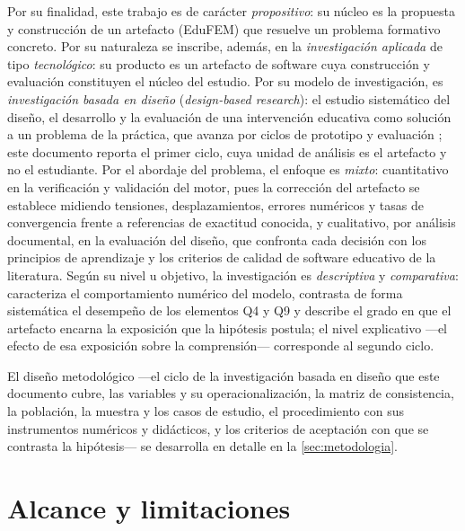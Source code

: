 Por su finalidad, este trabajo es de carácter \emph{propositivo}: su núcleo es la propuesta y construcción de un artefacto (EduFEM) que resuelve un problema formativo concreto. Por su naturaleza se inscribe, además, en la \emph{investigación aplicada} de tipo \emph{tecnológico}: su producto es un artefacto de software cuya construcción y evaluación constituyen el núcleo del estudio. Por su modelo de investigación, es \emph{investigación basada en diseño} (\emph{design-based research}): el estudio sistemático del diseño, el desarrollo y la evaluación de una intervención educativa como solución a un problema de la práctica, que avanza por ciclos de prototipo y evaluación \autocite{plomp2013edr}; %
este documento reporta el primer ciclo, cuya unidad de análisis es el artefacto y no el estudiante. Por el abordaje del problema, el enfoque es \emph{mixto}: cuantitativo en la verificación y validación del motor, pues la corrección del artefacto se establece midiendo tensiones, desplazamientos, errores numéricos y tasas de convergencia frente a referencias de exactitud conocida, y cualitativo, por análisis documental, en la evaluación del diseño, que confronta cada decisión con los principios de aprendizaje y los criterios de calidad de software educativo de la literatura. Según su nivel u objetivo, la investigación es \emph{descriptiva} y \emph{comparativa}: caracteriza el comportamiento numérico del modelo, contrasta de forma sistemática el desempeño de los elementos Q4 y Q9 y describe el grado en que el artefacto encarna la exposición que la hipótesis postula; el nivel explicativo —el efecto de esa exposición sobre la comprensión— corresponde al segundo ciclo.

El diseño metodológico —el ciclo de la investigación basada en diseño que este documento cubre, las variables y su operacionalización, la matriz de consistencia, la población, la muestra y los casos de estudio, el procedimiento con sus instrumentos numéricos y didácticos, y los criterios de aceptación con que se contrasta la hipótesis— se desarrolla en detalle en la \autoref{sec:metodologia}.

\section*{Alcance y limitaciones}

